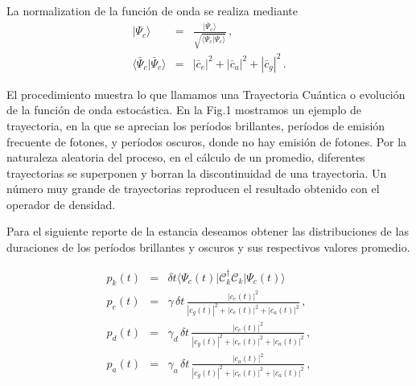 \documentclass[twocolumn,aps,eqsecnum,showkeys,amsmath]{revtex4}
\newcommand{\mcC}{\mathcal{C}}
\providecommand{\bra}[1]{\langle #1 \rvert}
\providecommand{\ket}[1]{\lvert #1 \rangle}
\providecommand{\braket}[2]{\langle #1 \rvert #2 \rangle}
\begin{document}
La normalization de la funci\'on de onda se realiza mediante 
%
\begin{eqnarray}
\ket{\Psi_c} &=& \frac{ \ket{\bar{\Psi}_c} }
	{ \sqrt{ \braket{ \bar{\Psi}_c}{\bar{\Psi}_c}  }  } \,, \\ 
\braket{ \bar{\Psi}_c}{\bar{\Psi}_c} &=& |\bar{c}_e|^2 +|\bar{c}_a|^2 
	+|\bar{c}_g|^2	\,.
\end{eqnarray}


El procedimiento muestra lo que llamamos una Trayectoria Cu\'antica 
o evoluci\'on de la funci\'on de onda estoc\'astica. En la Fig.1 mostramos 
un ejemplo de trayectoria, en la que se aprecian los per\'iodos brillantes, 
per\'iodos de emisi\'on frecuente de fotones, y per\'iodos oscuros, donde 
no hay emisi\'on de fotones. Por la naturaleza aleatoria del proceso, en el 
c\'alculo de un promedio, diferentes trayectorias se superponen y borran la 
 discontinuidad de una trayectoria. Un n\'umero muy grande de trayectorias 
 reproducen el resultado obtenido con el operador de densidad. 
 
 Para el siguiente reporte de la estancia deseamos obtener las 
 distribuciones de las duraciones de los per\'iodos brillantes y oscuros y 
 sus respectivos valores promedio. 


%
\begin{eqnarray}
p_k(t) &=& \delta t \bra{\Psi_c (t)} \mcC_k^\dag \mcC_k \ket{\Psi_c (t)} 	\\
p_e(t) &=& \gamma\, \delta t \, 
	\frac{|c_e(t)|^2}{|c_g(t)|^2 +|c_e(t)|^2 +|c_a(t)|^2} \,, \\
p_d(t) &=& \gamma_d\, \delta t \, 
	\frac{|c_e(t)|^2}{|c_g(t)|^2 +|c_e(t)|^2 +|c_a(t)|^2} \,, \\
p_a(t) &=& \gamma_a\, \delta t \, 
	\frac{|c_a(t)|^2}{|c_g(t)|^2 +|c_e(t)|^2 +|c_a(t)|^2} \,,
	\end{eqnarray}


\end{document}
